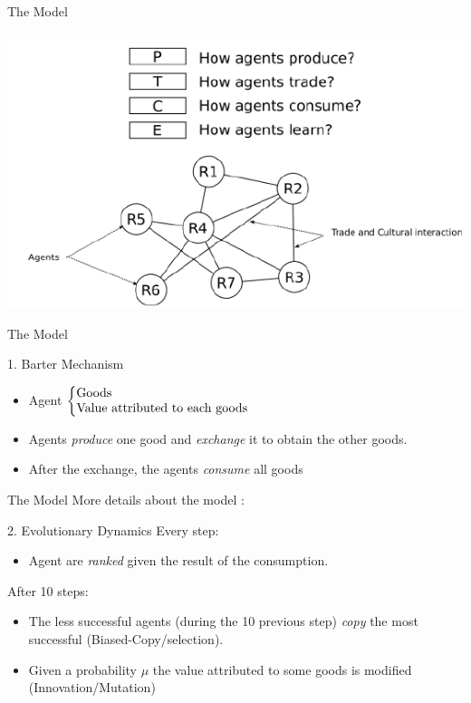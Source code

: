 \documentclass[12pt, handout=show,notes=show]{beamer}
\begin{document}
\begin{frame}{The Model}
	\begin{center}
	    \includegraphics[width=\textwidth]{images/schema_model.png}
	\end{center}
\end{frame}

	
\begin{frame}{The Model}
	\begin{block}{1. Barter Mechanism}
	    \begin{itemize}
		\item Agent 
		    $\left\{
			\begin{tabular}{@{}l@{}}
			    Goods \\
			    Value attributed to each goods\\
			\end{tabular}
			\right.$
		    \item Agents \emph{produce} one good and \emph{exchange} it to obtain the other goods.
		    \item After the exchange, the agents \emph{consume} all goods 
		\end{itemize}

	\end{block}
\end{frame}

\begin{frame}{The Model}
    More details about the model : 
    \vfill
	\begin{block}{2. Evolutionary Dynamics}
	    Every step:
	    \begin{itemize}
		    \item Agent are \emph{ranked} given the result of the consumption.
	    \end{itemize}
		After 10 steps:
		\begin{itemize}
		    \item  The less successful agents (during the 10 previous step) \emph{copy} the most successful (Biased-Copy/selection).
			\item Given a probability $\mu$ the value attributed to some goods is modified (Innovation/Mutation)
		\end{itemize}
	\end{block}
\end{frame}
\end{document}
